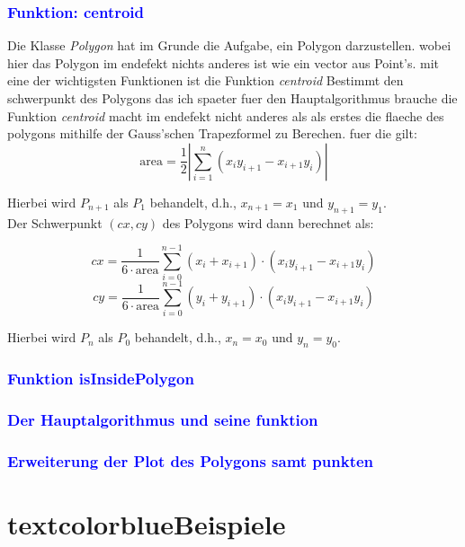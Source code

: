 \documentclass{article}
\begin{document}
\subsubsection{\textcolor{blue}{Funktion: centroid}}
\begin{center}
Die Klasse \textit{Polygon} hat im Grunde die Aufgabe, ein Polygon darzustellen. wobei hier das Polygon im endefekt nichts anderes ist wie ein vector aus Point's. mit eine der wichtigsten Funktionen ist die Funktion \textit{centroid} Bestimmt den schwerpunkt des Polygons das ich spaeter fuer den Hauptalgorithmus brauche die Funktion \textit{centroid} macht im endefekt nicht anderes als als erstes die flaeche des polygons mithilfe der Gauss'schen Trapezformel zu Berechen. fuer die gilt:
\[
\text{area} = \frac{1}{2} \left| \sum_{i=1}^{n} (x_i y_{i+1} - x_{i+1} y_i) \right|
\]

Hierbei wird $P_{n+1}$ als $P_1$ behandelt, d.h., $x_{n+1} = x_1$ und $y_{n+1} = y_1$.
\\
Der Schwerpunkt $(cx, cy)$ des Polygons wird dann berechnet als:

\[
cx = \frac{1}{6 \cdot \text{area}} \sum_{i=0}^{n-1} (x_i + x_{i+1}) \cdot (x_i y_{i+1} - x_{i+1} y_i)
\]
\[
cy = \frac{1}{6 \cdot \text{area}} \sum_{i=0}^{n-1} (y_i + y_{i+1}) \cdot (x_i y_{i+1} - x_{i+1} y_i)
\]

Hierbei wird $P_{n}$ als $P_0$ behandelt, d.h., $x_{n} = x_0$ und $y_{n} = y_0$.
\end{center}
\subsubsection{\textcolor{blue}{Funktion isInsidePolygon}}
\subsubsection{\textcolor{blue}{Der Hauptalgorithmus und seine funktion}}
\subsubsection{\textcolor{blue}{Erweiterung der Plot des Polygons samt punkten}}
\begin{center}

\end{center}
\section{textcolor{blue}{Beispiele}}
\begin{center}

\end{center}
\end{document}
